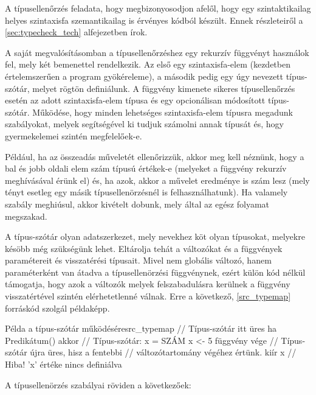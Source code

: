 A típusellenőrzés feladata, hogy megbizonyosodjon afelől, hogy egy szintaktikailag helyes szintaxisfa szemantikailag is érvényes kódból készült. Ennek részleteiről a \ref{sec:typecheck_tech} alfejezetben írok.

A saját megvalósításomban a típusellenőrzéshez egy rekurzív függvényt használok fel, mely két bemenettel rendelkezik. Az első egy szintaxisfa-elem (kezdetben értelemszerűen a program gyökéreleme), a második pedig egy úgy nevezett típus-szótár, melyet rögtön definiálunk. A függvény kimenete sikeres típusellenőrzés esetén az adott szintaxisfa-elem típusa és egy opcionálisan módosított típus-szótár. Működése, hogy minden lehetséges szintaxisfa-elem típusra megadunk szabályokat, melyek segítségével ki tudjuk számolni annak típusát és, hogy gyermekelemei szintén megfelelőek-e.

Például, ha az összeadás műveletét ellenőrizzük, akkor meg kell néznünk, hogy a bal és jobb oldali elem szám típusú értékek-e (melyeket a függvény rekurzív meghívásával érünk el) és, ha azok, akkor a művelet eredménye is szám lesz (mely tényt esetleg egy másik típusellenörzésnél is felhasználhatunk). Ha valamely szabály meghiúsul, akkor kivételt dobunk, mely által az egész folyamat megszakad.

A típus-szótár olyan adatszerkezet, mely nevekhez köt olyan típusokat, melyekre késöbb még szükségünk lehet. Eltárolja tehát a változókat és a függvények paramétereit és visszatérési típusait. Mivel nem globális változó, hanem paraméterként van átadva a típusellenörzési függvénynek, ezért külön kód nélkül támogatja, hogy azok a változók melyek felszabadulásra kerülnek a függvény visszatértével szintén elérhetetlenné válnak. Erre a következő, \ref{src_typemap} forráskód szolgál példaképp.

\begin{code}{Példa a típus-szótár működésére}{src_typemap}
// Típus-szótár itt üres
ha Predikátum() akkor
    // Típus-szótár: {x = SZÁM}
    x <- 5
függvény vége
// Típus-szótár újra üres, hisz a fentebbi 
// változótartomány végéhez értünk.
kiír x
// Hiba! 'x' értéke nincs definiálva
\end{code}

A típusellenörzés szabályai röviden a következőek:

